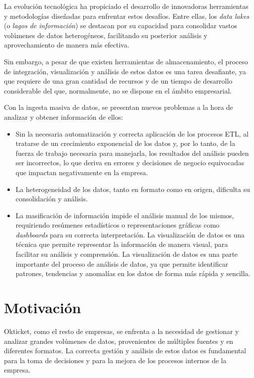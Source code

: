La evolución tecnológica ha propiciado el desarrollo de innovadoras herramientas y metodologías
diseñadas para enfrentar estos desafíos. Entre ellas, los \textit{data lakes} (o \emph{lagos de
información}) se destacan por su capacidad para consolidar vastos volúmenes de datos heterogéneos,
facilitando su posterior análisis y aprovechamiento de manera más efectiva.

Sin embargo, a pesar de que existen herramientas de almacenamiento, el proceso de integración,
visualización y análisis de estos datos es una tarea desafiante, ya que requiere de una gran
cantidad de recursos y de un tiempo de desarrollo considerable del que, normalmente, no se dispone
en el ámbito empresarial.

Con la ingesta masiva de datos, se presentan nuevos problemas a la hora de analizar y obtener
información de ellos:

\begin{itemize}
	\item Sin la necesaria automatización y correcta aplicación de los procesos ETL,
		al tratarse de un crecimiento exponencial de los datos y, por lo tanto, de la fuerza
		de trabajo necesaria para manejarla, los resultados del análisis pueden ser incorrectos,
		lo que deriva en errores y decisiones de negocio equivocadas que impactan negativamente
		en la empresa.
	\item La heterogeneidad de los datos, tanto en formato como en origen, dificulta su
		consolidación y análisis.
	\item La masificación de información impide el análisis manual de los mismos, requiriendo resúmenes
		estadísticos o representaciones gráficas como \textit{dashboards} para su correcta interpretación.
		La visualización de datos es una técnica que permite representar la información de manera visual,
		para facilitar su análisis y comprensión. La visualización de datos es una parte importante del
		proceso de análisis de datos, ya que permite identificar patrones, tendencias y anomalías en los
		datos de forma más rápida y sencilla.
\end{itemize}

\newpage{}
\section{Motivación}\label{sec:motivacion}
Okticket, como el resto de empresas, se enfrenta a la necesidad de gestionar y analizar grandes
volúmenes de datos, provenientes de múltiples fuentes y en diferentes formatos. La correcta gestión
y análisis de estos datos es fundamental para la toma de decisiones y para la mejora de los procesos
internos de la empresa.

